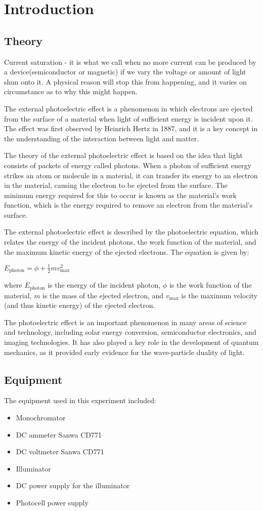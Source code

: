 \section{Introduction}

\subsection{Theory}
 Current saturation - it is what we call when no more current can be produced by a device(semiconductor or magnetic) if we vary the voltage or amount of light shun onto it. A physical reason will stop this from happening, and it varies on circumstance as to why this might happen.
 
 The external photoelectric effect is a phenomenon in which electrons are ejected from the surface of a material when light of sufficient energy is incident upon it. The effect was first observed by Heinrich Hertz in 1887, and it is a key concept in the understanding of the interaction between light and matter.

The theory of the external photoelectric effect is based on the idea that light consists of packets of energy called photons. When a photon of sufficient energy strikes an atom or molecule in a material, it can transfer its energy to an electron in the material, causing the electron to be ejected from the surface. The minimum energy required for this to occur is known as the material's work function, which is the energy required to remove an electron from the material's surface.

The external photoelectric effect is described by the photoelectric equation, which relates the energy of the incident photons, the work function of the material, and the maximum kinetic energy of the ejected electrons. The equation is given by:

$E_{\text{photon}} = \phi + \frac{1}{2}mv_{\text{max}}^2$

where $E_{\text{photon}}$ is the energy of the incident photon, $\phi$ is the work function of the material, $m$ is the mass of the ejected electron, and $v_{\text{max}}$ is the maximum velocity (and thus kinetic energy) of the ejected electron.

The photoelectric effect is an important phenomenon in many areas of science and technology, including solar energy conversion, semiconductor electronics, and imaging technologies. It has also played a key role in the development of quantum mechanics, as it provided early evidence for the wave-particle duality of light.

\subsection{Equipment}
The equipment used in this experiment included:
\begin{itemize}
	\item Monochromator
	\item DC ammeter Sanwa CD771
	\item DC voltmeter Sanwa CD771
	\item Illuminator
	\item DC power supply for the illuminator
	\item Photocell power supply
\end{itemize}


